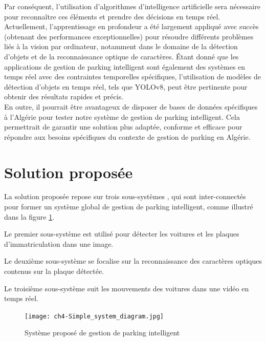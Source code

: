 Par conséquent, l'utilisation d'algorithmes d’intelligence artificielle sera nécessaire pour reconnaître ces éléments et prendre des décisions en temps réel. Actuellement, l'apprentissage en profondeur a été largement appliqué avec succès (obtenant des performances exceptionnelles) pour résoudre différents problèmes liés à la vision par ordinateur, notamment dans le domaine de la détection d'objets et de la reconnaissance optique de caractères. Étant donné que les applications de gestion de parking intelligent sont également des systèmes en temps réel avec des contraintes temporelles spécifiques, l'utilisation de modèles de détection d'objets en temps réel, tels que YOLOv8, peut être pertinente pour obtenir des résultats rapides et précis.\\
En outre, il pourrait être avantageux de disposer de bases de données spécifiques à l’Algérie pour tester notre système de gestion de parking intelligent. Cela permettrait de garantir une solution plus adaptée, conforme et efficace pour répondre aux besoins spécifiques du contexte de gestion de parking en Algérie.

\section{Solution proposée}
La solution proposée repose sur trois sous-systèmes , qui sont inter-connectés pour former un système global de gestion de parking intelligent, comme illustré dans la figure \ref{fig:ch4_Simple_system_diagram}. 

\begin{outline}
    \1 Le premier sous-système est utilisé pour détecter les voitures et les plaques d'immatriculation dans une image.

    \1 Le deuxième sous-système se focalise sur la reconnaissance des caractères optiques contenus sur la plaque détectée. 

    \1 Le troisième  sous-système  suit les mouvements des voitures dans une vidéo en temps réel.
\end{outline}

\begin{figure}[H]
	\centering
	\texttt{[image: ch4-Simple\_system\_diagram.jpg]}
	\caption{Système proposé de gestion de parking intelligent}
 \label{fig:ch4_Simple_system_diagram}
\end{figure}
